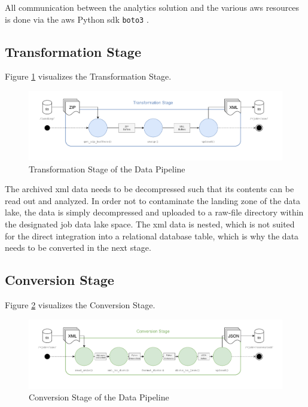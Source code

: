 All communication between the analytics solution and the various \ac{aws} resources is done via the \ac{aws} Python \ac{sdk} \texttt{boto3} \cite{boto3}.

\newpage

\subsection{Transformation Stage}
Figure \ref{fig:3-transform} visualizes the Transformation Stage.

\begin{figure}[h!]
	\includegraphics[width=\linewidth]{main-matter/img/3-3-1-transform.pdf}
	\caption{Transformation Stage of the Data Pipeline}
	\label{fig:3-transform}	
\end{figure}

The archived \ac{xml} data needs to be decompressed such that its contents can be read out and analyzed. In order not to contaminate the landing zone of the data lake, the data is simply decompressed and uploaded to a raw-file directory within the designated job data lake space. The \ac{xml} data is nested, which is not suited for the direct integration into a relational database table, which is why the data needs to be converted in the next stage.

\subsection{Conversion Stage} \label{sec:3-3-conversion}
Figure \ref{fig:3-convert} visualizes the Conversion Stage.

\begin{figure}[h!]
	\includegraphics[width=\linewidth]{main-matter/img/3-3-2-convert.pdf}
	\caption{Conversion Stage of the Data Pipeline}
	\label{fig:3-convert}	
\end{figure}

